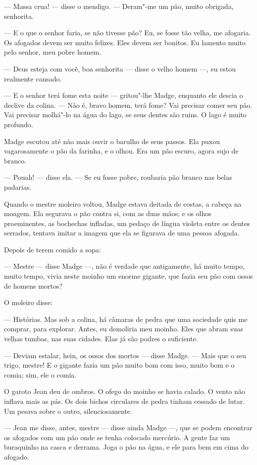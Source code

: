 --- Massa crua! --- disse o mendigo. --- Deram"-me um pão, muito obrigada,
senhorita.

--- E o que o senhor faria, se não tivesse pão? Eu, se fosse tão velha,
me afogaria. Os afogados devem ser muito felizes. Eles devem ser bonitos.
Eu lamento muito pelo senhor, meu pobre homem.

--- Deus esteja com você, boa senhorita --- disse o velho homem ---, eu estou
realmente cansado.

--- E o senhor terá fome esta noite --- gritou"-lhe Madge, enquanto ele
descia o declive da colina. --- Não é, bravo homem, terá fome? Vai precisar
comer seu pão. Vai precisar molhá"-lo na água do lago, se seus dentes são
ruins. O lago é muito profundo.

Madge escutou até não mais ouvir o barulho de seus passos. Ela puxou
vagarosamente o pão da farinha, e o olhou. Era um pão escuro,
agora sujo de branco.

--- Pouah! --- disse ela. --- Se eu fosse pobre, roubaria pão branco nas belas
padarias.

Quando o mestre moleiro voltou, Madge estava deitada de costas, a
cabeça na moagem. Ela segurava o pão contra si, com as duas mãos; e os
olhos proeminentes, as bochechas infladas, um pedaço de língua violeta
entre os dentes serrados, tentava imitar a imagem que ela se figurava de
uma pessoa afogada.

Depois de terem comido a sopa:

--- Mestre --- disse Madge ---, não é verdade que antigamente, há muito tempo,
muito tempo, vivia neste moinho um enorme gigante, que fazia seu pão com
ossos de homens mortos?

O moleiro disse:

--- Histórias. Mas sob a colina, há câmaras de pedra que uma sociedade
quis me comprar, para explorar. Antes, eu demoliria meu moinho. Eles que
abram suas velhas tumbas, nas suas cidades. Elas já são podres o
suficiente.

--- Deviam estalar, hein, os ossos dos mortos --- disse Madge. --- Mais que o
seu trigo, mestre! E o gigante fazia um pão muito bom com isso, muito bom
e o comia; sim, ele o comia.

O garoto Jean deu de ombros. O ofego do moinho se havia calado. O
vento não inflava mais as pás. Os dois bichos circulares de pedra tinham
cessado de lutar. Um pesava sobre o outro, silenciosamente.

--- Jean me disse, antes, mestre --- disse ainda Madge ---, que se podem
encontrar os afogados com um pão onde se tenha colocado mercúrio. A gente
faz um buraquinho na casca e derrama. Joga o pão na água, e ele para
bem em cima do afogado.

